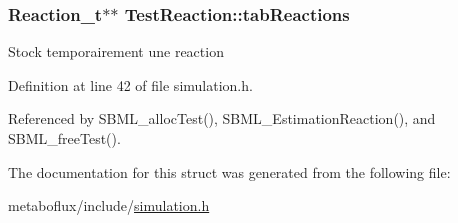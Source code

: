 \hypertarget{structTestReaction_abc440bf3f3edc3d4ca6ad896962ffad2}{
\subsubsection[{tabReactions}]{\setlength{\rightskip}{0pt plus 5cm}Reaction\_\-t$\ast$$\ast$ {\bf TestReaction::tabReactions}}}
\label{structTestReaction_abc440bf3f3edc3d4ca6ad896962ffad2}
Stock temporairement une reaction 

Definition at line 42 of file simulation.h.



Referenced by SBML\_\-allocTest(), SBML\_\-EstimationReaction(), and SBML\_\-freeTest().



The documentation for this struct was generated from the following file:\begin{DoxyCompactItemize}
\item 
metaboflux/include/\hyperlink{simulation_8h}{simulation.h}\end{DoxyCompactItemize}
